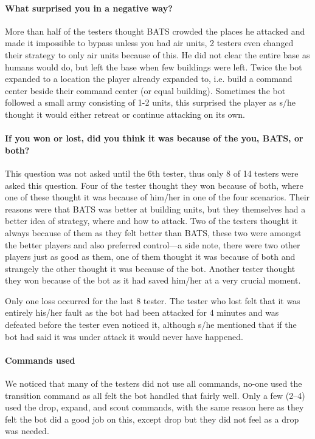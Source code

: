 \paragraph{What surprised you in a negative way?}
More than half of the testers thought BATS crowded the places he attacked and made it impossible to
bypass unless you had air units, 2 testers even changed their strategy to only air units because of
this. He did not clear the entire base as humans would do, but left the base when few buildings were
left. Twice the bot expanded to a location the player already expanded to, i.e. build a command
center beside their command center (or equal building). Sometimes the bot followed a small army
consisting of 1-2 units, this surprised the player as s/he thought it would either retreat or continue
attacking on its own.

\paragraph{If you won or lost, did you think it was because of the you, BATS, or both?}
This question was not asked until the 6th tester, thus only 8 of 14 testers were asked this
question. Four of the tester thought they won because of both, where one of these thought it was
because of him/her in one of the four scenarios. Their reasons were that BATS was better at building
units, but they themselves had a better idea of strategy, where and how to attack. Two of the
testers thought it always because of them as they felt better than BATS, these two were amongst the
better players and also preferred control—a side note, there were two other players just as good as
them, one of them thought it was because of both and strangely the other thought it was because of
the bot. Another tester thought they won because of the bot as it had saved him/her at a very
crucial moment.

Only one loss occurred for the last 8 tester. The tester who lost felt that it was entirely
his/her fault as the bot had been attacked for 4 minutes and was defeated before the tester even
noticed it, although s/he mentioned that if the bot had said it was under attack it would never have
happened.

\paragraph{Commands used}
We noticed that many of the testers did not use all commands, no-one used the transition command as
all felt the bot handled that fairly well. Only a few (2–4) used the drop, expand, and scout
commands, with the same reason here as they felt the bot did a good job on this, except drop but
they did not feel as a drop was needed.

